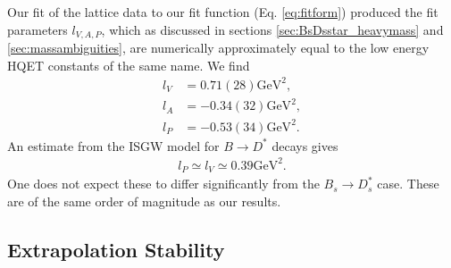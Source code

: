 Our fit of the lattice data to our fit function (Eq. \eqref{eq:fitform}) produced the fit parameters $l_{V,A,P}$, which as discussed in sections \ref{sec:BsDsstar_heavymass} and \ref{sec:massambiguities}, are numerically approximately equal to the low energy HQET constants of the same name. We find
\begin{align}
  \nonumber  l_V &= 0.71(28)\text{GeV}^2, \\  l_A &= -0.34(32)\text{GeV}^2, \label{eq:hqet_constants_hA1}
  \\ \nonumber l_P &= -0.53(34)\text{GeV}^2.
\end{align}
An estimate from the ISGW model for $B\to D^*$ decays gives \cite{PhysRevD.39.799}
\begin{align}
  l_P \simeq l_V \simeq 0.39\text{GeV}^2.
\end{align}
One does not expect these to differ significantly from the $B_s\to D_s^*$ case. These are of the same order of magnitude as our results.

\subsection{Extrapolation Stability}
\label{sec:stability_BsDsstar}

